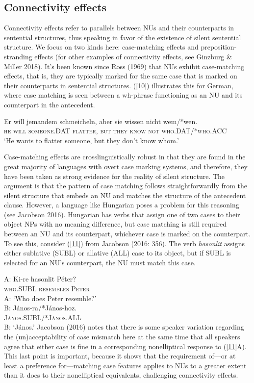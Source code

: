 \documentclass[output=paper
                ,modfonts
                ,nonflat
	        ,collection
	        ,collectionchapter
	        ,collectiontoclongg
 	        ,biblatex
                ,babelshorthands
                ,newtxmath
                ,draftmode
                ,colorlinks, citecolor=brown
]{./langsci/langscibook}
\begin{document}
{\subsection{Connectivity effects}
Connectivity effects refer to parallels between NUs and their counterparts in sentential structures, thus speaking in favor of the existence of silent sentential structure. We focus on two kinds here: case-matching effects and preposition-stranding effects (for other examples of connectivity effects, see Ginzburg \& Miller 2018). It's been known since Ross (1969) that NUs exhibit case-matching effects, that is, they are typically marked for the same case that is marked on their counterparts in sentential structures. (\ref{10}) illustrates this for German, where case matching is seen between a wh-phrase functioning as an NU and its counterpart in the antecedent.

\ea
\gll Er will jemandem schmeicheln, aber sie wissen nicht wem/*wen.\\
\textsc{he} \textsc{will} \textsc{someone.DAT} \textsc{flatter}, \textsc{but} \textsc{they} \textsc{know} \textsc{not} \textsc{who.DAT/*who.ACC}\\
\glt `He wants to flatter someone, but they don't know whom.'\label{10}\z

Case-matching effects are crosslinguistically robust in that they are found in the great majority of languages with overt case marking systems, and therefore, they have been taken as strong evidence for the reality of silent structure. The argument is that the pattern of case matching follows straightforwardly from the silent structure that embeds an NU and matches the structure of the antecedent clause. However, a language like Hungarian poses a problem for this reasoning (see Jacobson 2016). Hungarian has verbs that assign one of two cases to their object NPs with no meaning difference, but case matching is still required between an NU and its counterpart, whichever case is marked on the counterpart. To see this, consider (\ref{11}) from Jacobson (2016: 356). The verb {\it hasonlit} assigns either sublative (SUBL) or allative (ALL) case to its object, but if SUBL is selected for an NU's counterpart, the NU must match this case.

\ea
A: \gll Ki-re hasonlit P\'{e}ter?\\
 \textsc{who.SUBL} \textsc{resembles} \textsc{Peter}\\
 \glt A: `Who does Peter resemble?'\\

B: \gll J\'{a}nos-ra/*J\'{a}nos-hoz.\\
\textsc{J\'{a}nos.SUBL/*J\'{a}nos.ALL}\\
\glt B: `J\'{a}nos.'\label{11}\z
Jacobson (2016) notes that there is some speaker variation regarding the (un)ac\-cepta\-bi\-li\-ty of case mismatch here at the same time that all speakers agree that either case is fine in a corresponding nonelliptical response to (\ref{11}A). This last point is important, because it shows that the requirement of---or at least a preference for---matching case features applies to NUs to a greater extent than it does to their nonelliptical equivalents, challenging connectivity effects.

}
\end{document}
